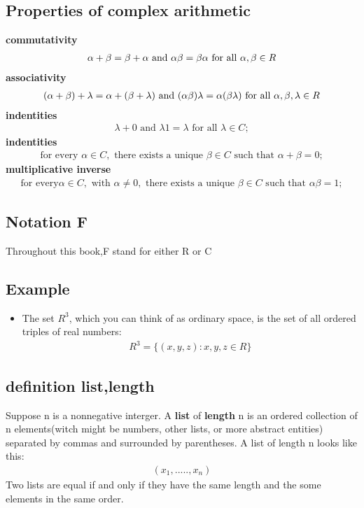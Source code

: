 \documentclass[a4paper,12pt]{article}
\begin{document}
\subsection{Properties of complex arithmetic}
\textbf{commutativity}
\begin{align*}
    \notag \alpha + \beta = \beta + \alpha  \text{ and }  \alpha\beta = \beta\alpha \text{ for all } \alpha,\beta \in R
\end{align*}
\textbf{associativity} 
\begin{align*}
    \notag (\alpha + \beta) + \lambda = \alpha + (\beta + \lambda) \text{ and }  (\alpha\beta)\lambda = \alpha(\beta\lambda)  \text{ for all } \alpha,\beta,\lambda \in R
\end{align*}
\textbf{indentities} 
\begin{align*}
    \lambda + 0 \text{ and } \lambda1 = \lambda \text{ for all } \lambda \in C;
\end{align*}
\textbf{indentities} 
\begin{align*}
    \text{for every } \alpha \in C, \text{ there exists a unique } \beta \in C \text{ such that } \alpha + \beta = 0;
\end{align*} 
\textbf{multiplicative inverse}
\begin{align*}
    \text{for every} \alpha \in C, \text{ with } \alpha \ne 0, \text{ there exists a unique } \beta \in C \text{ such that } \alpha\beta = 1; 
\end{align*} 

\subsection{Notation F}
Throughout this book,F stand for either R or C

\subsection{Example}
\begin{itemize}
    \item The set $R^3$, which you can think of as ordinary space, is the set of all ordered triples of real numbers:
    \begin{align*}
        R^3 = \{(x, y, z): x, y ,z \in R\}
    \end{align*}
\end{itemize}


\subsection{definition \textbf{list,length}}
Suppose n is a nonnegative interger. A \textbf{list} of \textbf{length} n is an ordered collection of n elements(witch might be numbers, other
lists, or more abstract entities) separated by commas and surrounded by parentheses. A list of length n looks like this:
\begin{align*}
    (x_1,.....,x_n)
\end{align*}
Two lists are equal if and only if they have the same length and the some elements in the same order.
\end{document}
